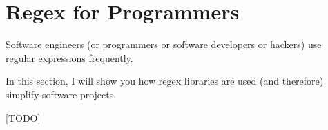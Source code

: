 \section{Regex for Programmers}

Software engineers (or programmers or software developers or hackers) 
use regular expressions frequently.

In this section, I will show you how regex libraries are used (and therefore)
simplify software projects.

[TODO]
